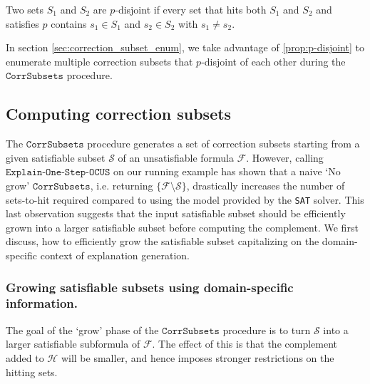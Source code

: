 \documentclass[a4paper,UKenglish,cleveref, autoref, thm-restate, pdfa]{lipics-v2021}
\newcommand\m[1]{\mathcal{#1}}
\renewcommand\comment[1]{}
\newcommand{\bart}[1]{{\comment{\color{OliveGreen}Bart: #1}}}
\newcommand\setstohit{\ensuremath{\m{H} }\xspace}
\newcommand\subsetT{\ensuremath{\m{S} }\xspace}
\newcommand\formula{\ensuremath{\m{F} }\xspace}
\newcommand\mm[1]{\ensuremath{#1}\xspace}
\newcommand\call[1]{\mm{\texttt{#1}}}
\newcommand\sat{\texttt{{SAT}}\xspace}
\newcommand\corrsubsets{\mm{\call{CorrSubsets}}}
\newcommand\onestepo{\ensuremath{\call{Explain-One-Step-OCUS}}\xspace}
\begin{document}
	\begin{proposition}\label{prop:p-disjoint}
		Two sets $S_1$ and $S_2$ are $p$-disjoint if every set that hits both $S_1$ and $S_2$ and satisfies $p$ contains $s_1\in S_1$ and $s_2\in S_2$ with $s_1 \neq s_2$.
	\end{proposition}
	
	In section \ref{sec:correction_subset_enum}, we take advantage of \cref{prop:p-disjoint} to enumerate multiple correction subsets that $p$-disjoint of each other during the \corrsubsets procedure.
	
	\subsection{Computing correction subsets}
	
	The \corrsubsets procedure generates a set of correction subsets starting from a given satisfiable subset $\subsetT$ of an unsatisfiable formula $\formula$. 
	However, calling \onestepo on our running example has shown that a naive `No grow' \corrsubsets, i.e. returning $\{\formula \setminus  \subsetT \}$, drastically increases the number of sets-to-hit required compared to using the model provided by the \sat solver. 
	This last observation suggests that the input satisfiable subset should be efficiently grown into a larger satisfiable subset before computing the complement.
	We first discuss, how to efficiently grow the satisfiable subset capitalizing on the domain-specific context of explanation generation.
	
	\subsubsection{Growing satisfiable subsets using domain-specific information.} \label{para:domainspecificgrow}
	
	
	The goal of the `grow' phase of the \corrsubsets procedure is to turn $\m{S}$ into a larger satisfiable subformula of $\formula$. The effect of this is that the complement added to \setstohit will be smaller, and hence imposes stronger restrictions on the hitting sets.
	
\end{document}
